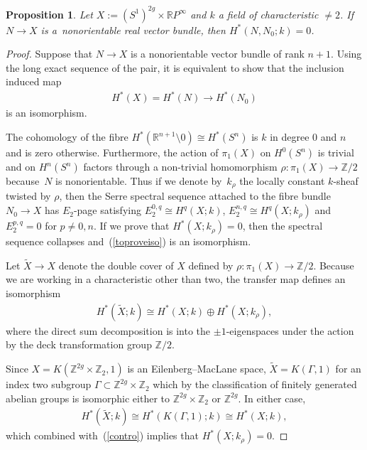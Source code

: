 \documentclass[pdftex]{sigma}
\numberwithin{equation}{section}
\newtheorem{Proposition}[Theorem]{Proposition}
\begin{document}
\begin{Proposition}\label{iszero}
Let $X := (S^1)^{2g} \times {\mathbb R} P^{\infty} $ and $k$ a field of characteristic $ \neq 2$. If $N \rightarrow X$ is a~nonorientable real vector bundle, then $H^*(N, N_0;k) = 0$.
\end{Proposition}

\begin{proof}
Suppose that $N \rightarrow X$ is a nonorientable vector bundle of rank $n+1$. Using the long exact sequence of the pair, it is equivalent to show that the inclusion induced map
\begin{gather}\label{toproveiso}
H^*(X) = H^*(N) \rightarrow H^*(N_0)
\end{gather} is an isomorphism.

The cohomology of the f\/ibre $H^*({\mathbb R}^{n+1} \setminus 0) \cong H^*(S^n)$ is $k$ in degree $0$ and $n$ and is zero otherwise. Furthermore, the action of $\pi_1(X)$ on $H^0(S^n)$ is trivial and on $H^n(S^n)$ factors through a non-trivial homomorphism $ \rho\colon \pi_1(X) \rightarrow {\mathbb Z}/2$ because~$N$ is nonorientable. Thus if we denote by~$k_{\rho}$ the locally constant $k$-sheaf twisted by $\rho$, then the Serre spectral sequence attached to the f\/ibre bundle $N_0 \rightarrow X $
has $E_2$-page satisfying $E_2^{0,q} \cong H^q(X;k)$, $E_2^{n,q} \cong H^q(X;k_{\rho})$ and $E_2^{p,q} =0$ for $p\neq 0, n$. If we prove that $H^*(X;k_{\rho})=0$, then the spectral sequence collapses and~(\ref{toproveiso}) is an isomorphism.

Let $\tilde{X} \rightarrow X$ denote the double cover of $X$ def\/ined by $ \rho\colon \pi_1(X) \rightarrow {\mathbb Z}/2$. Because we are working in a characteristic other than two, the transfer map def\/ines an isomorphism
\begin{gather}\label{contro}
H^*(\tilde{X};k) \cong H^*(X;k) \oplus H^*(X; k_{\rho}),
\end{gather}
where the direct sum decomposition is into the $\pm 1$-eigenspaces under the action by the deck transformation group ${\mathbb Z}/2$.

Since $X = K({\mathbb Z}^{2g}\times {\mathbb Z}_2, 1)$ is an Eilenberg--MacLane space, $\tilde{X} = K(\Gamma, 1)$ for an index two subgroup $ \Gamma \subset {\mathbb Z}^{2g}\times {\mathbb Z}_2$ which by the classif\/ication of f\/initely generated abelian groups is isomorphic either to $ {\mathbb Z}^{2g} \times {\mathbb Z}_2$ or $ {\mathbb Z}^{2g}$. In either case, \begin{gather*}H^*(\tilde{X};k) \cong H^*(K(\Gamma,1);k) \cong H^*(X; k), \end{gather*} which combined with~(\ref{contro}) implies that $H^*(X; k_{\rho})=0$.
\end{proof}
\end{document}
